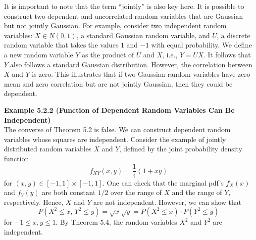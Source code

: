 It is important to note that the term ``jointly'' is also key here. It is possible to construct two dependent and uncorrelated random variables that are Gaussian but not jointly Gaussian. For example, consider two independent random variables: $X \in N(0,1)$, a standard Gaussian random variable, and $U$, a discrete random variable that takes the values $1$ and $-1$ with equal probability. We define a new random variable $Y$ as the product of $U$ and $X$, i.e., $Y=UX$. It follows that $Y$ also follows a standard Gaussian distribution. However, the correlation between $X$ and $Y$ is zero. This illustrates that if two Gaussian random variables have zero mean and zero correlation but are not jointly Gaussian, then they could be dependent.

\textbf{Example 5.2.2 (Function of Dependent Random Variables Can Be Independent)} \\
The converse of Theorem 5.2 is false. We can construct dependent random variables whose squares are independent. Consider the example of jointly distributed random variables $X$ and $Y$, defined by the joint probability density function
\[
f_{XY}(x,y)=\frac{1}{4}(1+xy)
\]
for $(x,y) \in [-1,1] \times [-1,1]$. One can check that the marginal pdf's $f_X(x)$ and $f_Y(y)$ are both constant $1/2$ over the range of $X$ and the range of $Y$, respectively. Hence, $X$ and $Y$ are not independent. However, we can show that
\[
P(X^2 \le x,\, Y^2 \le y)=\sqrt{x}\sqrt{y}=P(X^2 \le x)\cdot P(Y^2 \le y)
\]
for $-1 \le x,y \le 1$. By Theorem 5.4, the random variables $X^2$ and $Y^2$ are independent.
